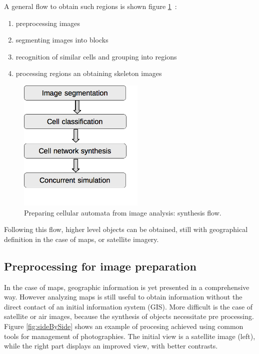 A general flow to obtain such regions  is  shown figure \ref{fig:pickcellFlow}~:
\begin{enumerate}
\item  preprocessing  images 
\item segmenting images into blocks
\item recognition of similar cells and grouping into regions
\item processing regions an obtaining skeleton images
\end{enumerate}

\begin{figure}[hbtp]
\begin{center} 
\includegraphics[width=6cm]{pickcellFlow.png}
\caption{Preparing cellular automata from image analysis: synthesis flow.}
\label{fig:pickcellFlow}
\end{center}
\end{figure}

Following this flow, higher level objects can be obtained, still with geographical definition in the case of
maps, or satellite imagery.

\subsection {Preprocessing for image preparation }

In the case of maps, geographic information is yet presented in a comprehensive way. However analyzing maps is still useful
to obtain information without the direct contact of an initial information system (GIS).
More difficult is the case of satellite or air  images, because the synthesis of objects necessitate
pre processing. Figure \ref{fig:sideBySide} shows an example of procesing achieved using common tools
for management of photographies. The initial view is a satellite image (left), while the right part displays an improved
view, with better contrasts.

